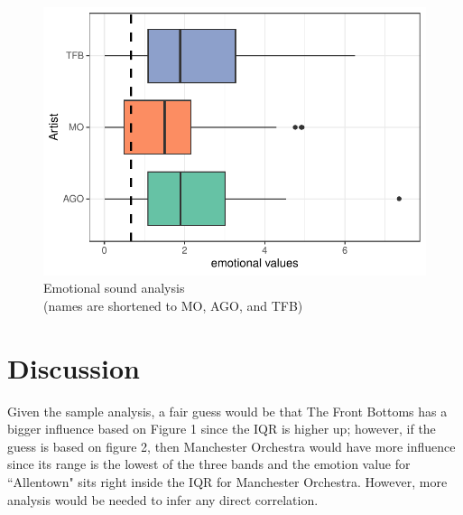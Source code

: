 \documentclass{article}\usepackage[]{graphicx}\usepackage[]{xcolor}
\makeatletter
\def\maxwidth{ %
  \ifdim\Gin@nat@width>\linewidth
    \linewidth
  \else
    \Gin@nat@width
  \fi
}
\newenvironment{knitrout}{}{} %
\makeatother
\begin{document}
\begin{multicols}{2}
\begin{figure}[H]
\begin{center}
\begin{knitrout}
\color{fgcolor}
\includegraphics[width=\maxwidth]{figure/unnamed-chunk-1-1} 
\end{knitrout}
\caption{Emotional sound analysis \\ (names are shortened to MO, AGO, and TFB)}
\label{plot1} 
\end{center}
\end{figure}



\section{Discussion}
  Given the sample analysis, a fair guess would be that The Front Bottoms has a bigger influence based on Figure 1 since the IQR is higher up; however, if the guess is based on figure 2, then Manchester Orchestra would have more influence since its range is the lowest of the three bands and the emotion value for ``Allentown" sits right inside the IQR for Manchester Orchestra. However, more analysis would be needed to infer any direct correlation. 




\vspace{2em}


\begin{tiny}

\end{tiny}
\end{multicols}
\end{document}
